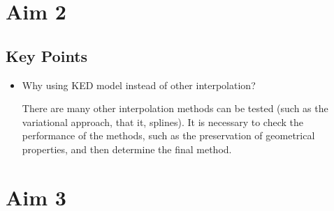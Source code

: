 \documentclass{article}
\begin{document}
\section{Aim 2}
\subsection{Key Points}
\begin{itemize}
    \item Why using KED model instead of other interpolation? {
    
    There are many other interpolation methods can be tested (such as the variational approach, that it, splines). It is necessary to check the performance of the methods, such as the preservation of geometrical properties, and then determine the final method.
    }
\end{itemize}

\section{Aim 3}
\end{document}
